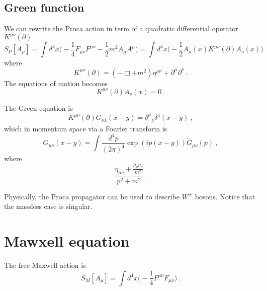 \section{Green function}

    We can rewrite the Proca action in term of a quadratic differential operator $K^{\mu\nu} (\partial)$
    \begin{equation*}
        S_P[A_\mu] = \int d^4 x \Big (-\frac{1}{4}  F_{\mu\nu} F^{\mu\nu} - \frac{1}{2} m^2 A_\mu A^\mu) = \int d^4 x \Big ( - \frac{1}{2} A_\mu (x) K^{\mu\nu} (\partial) A_\nu (x) \Big)
    \end{equation*}
    where 
    \begin{equation*}
        K^{\mu\nu} (\partial) = (- \Box + m^2) \eta^{\mu\nu} + \partial^\mu \partial^\nu ~.
    \end{equation*}
    The equations of motion becomes 
    \begin{equation*}
        K^{\mu\nu} (\partial) A_\nu (x) = 0~.
    \end{equation*}

    The Green equation is 
    \begin{equation*}
        K^{\mu\nu} (\partial) G_{\nu\lambda} (x-y) = \delta^\mu_{\phantom \mu \lambda} \delta^4 (x-y) ~,
    \end{equation*}
    which in momentum space via a Fourier transform is 
    \begin{equation*}
        G_{\mu\nu} (x-y) = \int \frac{d^4 p}{(2\pi)^4} \exp(i p (x-y)) \tilde G_{\mu\nu} (p) ~,
    \end{equation*}
    where 
    \begin{equation*}
        \frac{\eta_{\mu\nu} + \frac{p_\mu p_\nu}{m^2}}{p^2 + m^2} ~.
    \end{equation*}

    Physically, the Proca propagator can be used to describe $W^\pm$ bosons. Notice that the massless case is singular.

\chapter{Mawxell equation}

    The free Maxwell action is 
    \begin{equation*}
        S_M [A_\mu] = \int d^4 x \Big (- \frac{1}{4} F^{\mu\nu} F_{\mu\nu} \Big) ~.
    \end{equation*} 

